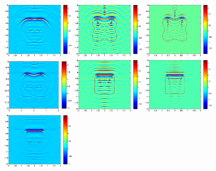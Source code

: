 \documentclass[12pt]{iopart}
\begin{document}
{\begin{figure}
	\includegraphics[width=0.32\textwidth]{./graphic/peanut.eps}
	\includegraphics[width=0.32\textwidth]{./graphic/p_leaf_3pi.eps}
	\includegraphics[width=0.32\textwidth]{./graphic/p_leaf_5pi.eps}
	\includegraphics[width=0.32\textwidth]{./graphic/p_leaf.eps}
	\includegraphics[width=0.32\textwidth]{./graphic/rectangle_3pi.eps}
	\includegraphics[width=0.32\textwidth]{./graphic/rectangle_5pi.eps}
	\includegraphics[width=0.32\textwidth]{./graphic/rectangle.eps}
	

\end{figure}}
\end{document}
